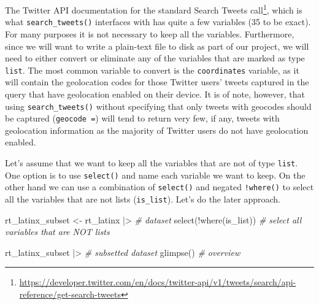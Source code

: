 \documentclass[
  letterpaper,
]{latex/krantz}
\newenvironment{Shaded}{\begin{snugshade}}{\end{snugshade}}
\newcommand{\CommentTok}[1]{\textcolor[rgb]{0.00,0.00,0.00}{\textit{#1}}}
\newcommand{\FunctionTok}[1]{\textcolor[rgb]{0.00,0.00,0.00}{#1}}
\newcommand{\NormalTok}[1]{\textcolor[rgb]{0.00,0.00,0.00}{#1}}
\newcommand{\OtherTok}[1]{\textcolor[rgb]{0.00,0.00,0.00}{#1}}
\newcommand{\SpecialCharTok}[1]{\textcolor[rgb]{0.00,0.00,0.00}{#1}}
\DeclareRobustCommand{\href}[2]{#2\footnote{\url{#1}}}
\begin{document}
The
\href{https://developer.twitter.com/en/docs/twitter-api/v1/tweets/search/api-reference/get-search-tweets}{Twitter
API documentation for the standard Search Tweets call}, which is what
\texttt{search\_tweets()} interfaces with has quite a few variables (35
to be exact). For many purposes it is not necessary to keep all the
variables. Furthermore, since we will want to write a plain-text file to
disk as part of our project, we will need to either convert or eliminate
any of the variables that are marked as type \texttt{list}. The most
common variable to convert is the \texttt{coordinates} variable, as it
will contain the geolocation codes for those Twitter users' tweets
captured in the query that have geolocation enabled on their device. It
is of note, however, that using \texttt{search\_tweets()} without
specifying that only tweets with geocodes should be captured
(\texttt{geocode\ =}) will tend to return very few, if any, tweets with
geolocation information as the majority of Twitter users do not have
geolocation enabled.

Let's assume that we want to keep all the variables that are not of type
\texttt{list}. One option is to use \texttt{select()} and name each
variable we want to keep. On the other hand we can use a combination of
\texttt{select()} and negated \texttt{!where()} to select all the
variables that are not lists (\texttt{is\_list}). Let's do the later
approach.

\begin{Shaded}
\begin{Highlighting}[]
\NormalTok{rt\_latinx\_subset }\OtherTok{\textless{}{-}} 
\NormalTok{  rt\_latinx }\SpecialCharTok{|\textgreater{}} \CommentTok{\# dataset}
  \FunctionTok{select}\NormalTok{(}\SpecialCharTok{!}\FunctionTok{where}\NormalTok{(is\_list))  }\CommentTok{\# select all variables that are NOT lists}

\NormalTok{rt\_latinx\_subset }\SpecialCharTok{|\textgreater{}} \CommentTok{\# subsetted dataset}
  \FunctionTok{glimpse}\NormalTok{() }\CommentTok{\# overview}
\end{Highlighting}
\end{Shaded}
\end{document}
